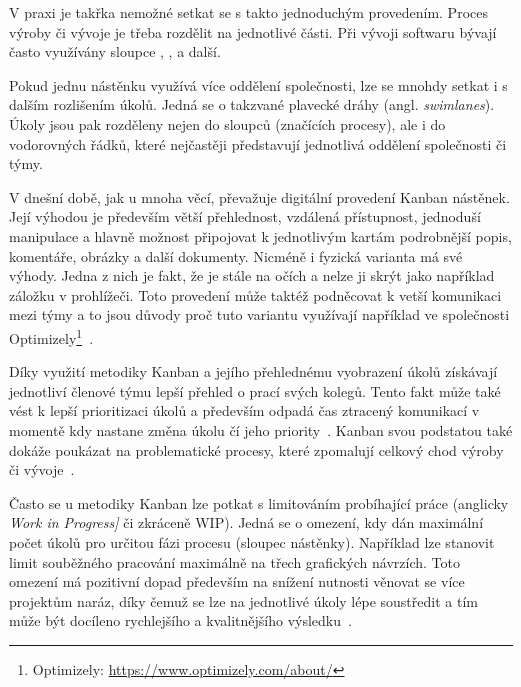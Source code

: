 V praxi je takřka nemožné setkat se s takto jednoduchým provedením. Proces výroby či vývoje je třeba rozdělit na jednotlivé části. Při vývoji softwaru bývají často využívány sloupce , ,  a další.  

Pokud jednu nástěnku využívá více oddělení společnosti, lze se mnohdy setkat i s dalším rozlišením úkolů. Jedná se o takzvané plavecké dráhy (angl. \emph{swimlanes}). Úkoly jsou pak rozděleny nejen do sloupců (značících procesy), ale i do vodorovných řádků, které nejčastěji představují jednotlivá oddělení společnosti či týmy. 

V dnešní době, jak u mnoha věcí, převažuje digitální provedení Kanban nástěnek. Její výhodou je především větší přehlednost, vzdálená přístupnost, jednoduší manipulace a hlavně možnost připojovat k jednotlivým kartám podrobnější popis, komentáře, obrázky a další dokumenty. Nicméně i fyzická varianta má své výhody. Jedna z nich je fakt, že je stále na očích a nelze ji skrýt jako například záložku v prohlížeči. Toto provedení může taktéž podněcovat k vetší komunikaci mezi týmy a to jsou důvody proč tuto variantu využívají například ve společnosti Optimizely\footnote{Optimizely: \url{https://www.optimizely.com/about/}}~\cite{bib:kanban-atlassian}.

Díky využití metodiky Kanban a jejího přehlednému vyobrazení úkolů získávají jednotliví členové týmu lepší přehled o prací svých kolegů. Tento fakt může také vést k lepší prioritizaci úkolů a především odpadá čas ztracený komunikací v momentě kdy nastane změna úkolu čí jeho priority~\cite{bib:kanban-101}.
Kanban svou podstatou také dokáže poukázat na problematické procesy, které zpomalují celkový chod výroby či vývoje~\cite{bib:kanban-and-scrum}.

Často se u metodiky Kanban lze potkat s limitováním probíhající práce (anglicky \emph{Work in Progress]} či zkráceně WIP). Jedná se o omezení, kdy dán maximální počet úkolů pro určitou fázi procesu (sloupec nástěnky). Například lze stanovit limit souběžného pracování maximálně na třech grafických návrzích. Toto omezení má pozitivní dopad především na snížení nutnosti věnovat se více projektům naráz, díky čemuž se lze na jednotlivé úkoly lépe soustředit a tím může být docíleno rychlejšího a kvalitnějšího výsledku~\cite{bib:kanban-101}.


